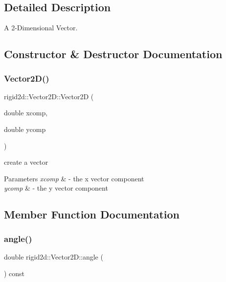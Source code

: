 \subsection{Detailed Description}
A 2-\/\+Dimensional Vector. 

\subsection{Constructor \& Destructor Documentation}
\mbox{\label{structrigid2d_1_1Vector2D_a26d3fdc99cc873ff8785a70b7f379463}} 
\subsubsection{\texorpdfstring{Vector2\+D()}{Vector2D()}}
{\footnotesize\ttfamily rigid2d\+::\+Vector2\+D\+::\+Vector2D (\begin{DoxyParamCaption}\item[{double}]{xcomp,  }\item[{double}]{ycomp }\end{DoxyParamCaption})}



create a vector 


\begin{DoxyParams}{Parameters}
{\em xcomp} & -\/ the x vector component \\
\hline
{\em ycomp} & -\/ the y vector component \\
\hline
\end{DoxyParams}


\subsection{Member Function Documentation}
\mbox{\label{structrigid2d_1_1Vector2D_a61ec013677fd4439fa21c35656fe7256}} 
\subsubsection{\texorpdfstring{angle()}{angle()}}
{\footnotesize\ttfamily double rigid2d\+::\+Vector2\+D\+::angle (\begin{DoxyParamCaption}{ }\end{DoxyParamCaption}) const}



